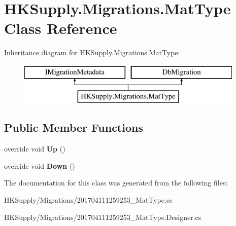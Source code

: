 \hypertarget{class_h_k_supply_1_1_migrations_1_1_mat_type}{}\section{H\+K\+Supply.\+Migrations.\+Mat\+Type Class Reference}
\label{class_h_k_supply_1_1_migrations_1_1_mat_type}
Inheritance diagram for H\+K\+Supply.\+Migrations.\+Mat\+Type\+:\begin{figure}[H]
\begin{center}
\leavevmode
\includegraphics[height=2.000000cm]{class_h_k_supply_1_1_migrations_1_1_mat_type}
\end{center}
\end{figure}
\subsection*{Public Member Functions}
\begin{DoxyCompactItemize}
\item 
\mbox{\label{class_h_k_supply_1_1_migrations_1_1_mat_type_a31b23dddaeb85d1ec682c88902be074b}} 
override void {\bfseries Up} ()
\item 
\mbox{\label{class_h_k_supply_1_1_migrations_1_1_mat_type_ab601159d55211b7350fc86c3a81bb786}} 
override void {\bfseries Down} ()
\end{DoxyCompactItemize}


The documentation for this class was generated from the following files\+:\begin{DoxyCompactItemize}
\item 
H\+K\+Supply/\+Migrations/201704111259253\+\_\+\+Mat\+Type.\+cs\item 
H\+K\+Supply/\+Migrations/201704111259253\+\_\+\+Mat\+Type.\+Designer.\+cs\end{DoxyCompactItemize}
